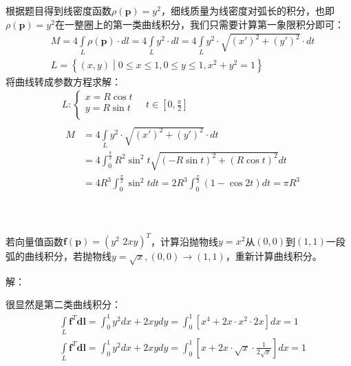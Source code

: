 根据题目得到线密度函数$\rho \left( \boldsymbol{p} \right) =y^2$，细线质量为线密度对弧长的积分，也即$\rho \left( \boldsymbol{p} \right) =y^2$在一整圈上的第一类曲线积分，我们只需要计算第一象限积分即可：
\begin{align*}
&M=4\int\limits_L{\rho \left( \boldsymbol{p} \right) \cdot dl}=4\int\limits_L{y^2\cdot dl}=4\int\limits_L{y^2\cdot \sqrt{\left( x' \right) ^2+\left( y' \right) ^2}\cdot dt} \\
&L=\left\{ \left( x,y \right) \middle| 0\leqslant x\leqslant 1,0\leqslant y\leqslant 1,x^2+y^2=1 \right\}
\end{align*}
将曲线转成参数方程求解：
\begin{align*}
&L:\begin{cases}
	x=R\cos t\\
	y=R\sin t\\
\end{cases} \quad t\in \left[ 0,\frac{\pi}{2} \right] \\
&\begin{aligned}
	M&=4\int\limits_L{y^2\cdot \sqrt{\left( x' \right) ^2+\left( y' \right) ^2}\cdot dt} \\
    &=4\int_0^{\frac{\pi}{2}}{R^2\sin ^2t\sqrt{\left( -R\sin t \right) ^2+\left( R\cos t \right) ^2}dt}\\
	&=4R^3\int_0^{\frac{\pi}{2}}{\sin ^2tdt}=2R^3\int_0^{\frac{\pi}{2}}{\left( 1-\cos 2t \right) dt}=\pi R^3\\
\end{aligned}
\end{align*}

~

\begin{exercise}
若向量值函数$\boldsymbol{f}\left( \boldsymbol{p} \right) =\left( y^2\,\,2xy \right) ^T$，计算沿抛物线$y=x^2$从$\left( 0,0 \right) $到$\left( 1,1 \right) $一段弧的曲线积分，若抛物线$y=\sqrt{x},\left( 0,0 \right) \rightarrow \left( 1,1 \right) $，重新计算曲线积分。
\end{exercise}

解：

很显然是第二类曲线积分：
\begin{align*}
&\int\limits_L{\boldsymbol{f}^T\boldsymbol{dl}}=\int_0^1{y^2dx+2xydy}=\int_0^1{\left[ x^4+2x\cdot x^2\cdot 2x \right] dx}=1 \\
&\int\limits_L{\boldsymbol{f}^T\boldsymbol{dl}}=\int_0^1{y^2dx+2xydy}=\int_0^1{\left[ x+2x\cdot \sqrt{x}\cdot \frac{1}{2\sqrt{x}} \right] dx}=1
\end{align*}

